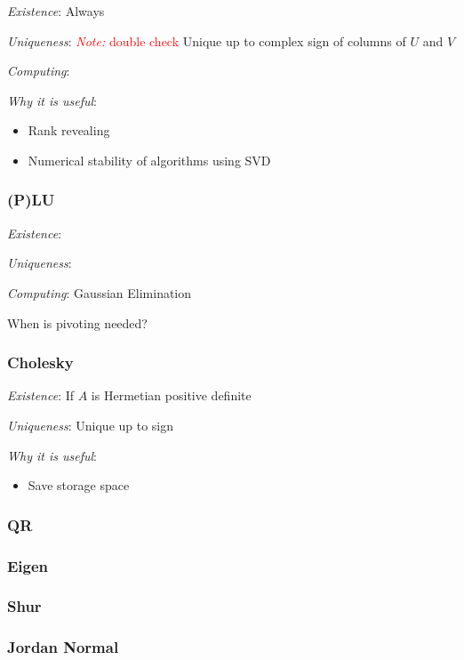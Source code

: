 \documentclass[12pt]{article}
\newcommand{\note}[1]{\textcolor{red}{\textit{Note:} #1}}
\begin{document}
\textit{Existence}:
Always

\textit{Uniqueness}:
\note{double check}
Unique up to complex sign of columns of \( U \) and \( V \)

\textit{Computing}:


\textit{Why it is useful}:
\begin{itemize}[nolistsep]
    \item Rank revealing
    \item Numerical stability of algorithms using SVD
\end{itemize}


\subsubsection{(P)LU}

\textit{Existence}:

\textit{Uniqueness}:

\textit{Computing}:
Gaussian Elimination 

When is pivoting needed?



\subsubsection{Cholesky}
\label{sec:cholesky}
\textit{Existence}: If \( A \) is Hermetian positive definite

\textit{Uniqueness}: Unique up to sign

\textit{Why it is useful}:
\begin{itemize}[nolistsep]
    \item Save storage space
\end{itemize}

\subsubsection{QR}


\subsubsection{Eigen}


\subsubsection{Shur}

\subsubsection{Jordan Normal}
\end{document}
